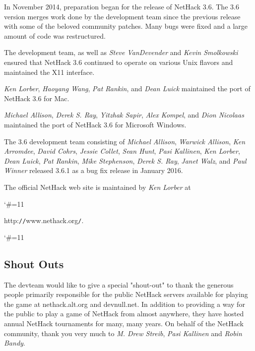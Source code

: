 \medskip
In November 2014, preparation began for the release of NetHack 3.6. The 3.6
version merges work done by the development team since the previous release 
with some of the beloved community patches. Many bugs were fixed and a 
large amount of code was restructured.

\medskip
The development team, as well as {\it Steve VanDevender} and 
{\it Kevin Smolkowski} ensured that NetHack 3.6 continued to operate on 
various Unix flavors and maintained the X11 interface. 

{\it Ken Lorber}, {\it Haoyang Wang}, {\it Pat Rankin}, and {\it Dean Luick} 
maintained the port of NetHack 3.6 for Mac.

\medskip
{\it Michael Allison}, {\it Derek S. Ray}, {\it Yitzhak Sapir}, 
{\it Alex Kompel}, and {\it Dion Nicolaas} maintained the port of 
NetHack 3.6 for Microsoft Windows.

\medskip
The 3.6 development team consisting of
{\it Michael Allison}, {\it Warwick Allison}, {\it Ken Arromdee},
{\it David Cohrs}, {\it Jessie Collet}, {\it Sean Hunt}, 
{\it Pasi Kallinen}, {\it Ken Lorber}, {\it Dean Luick}, {\it Pat Rankin}, 
{\it Mike Stephenson}, {\it Derek S. Ray}, {\it Janet Walz}, and {\it Paul Winner}
released 3.6.1 as a bug fix release in January 2016.

\medskip
\nd The official NetHack web site is maintained by {\it Ken Lorber} at 
{\catcode`\#=11
}
http:{\tt /}{\tt /}www.nethack.org{\tt /}.
{\catcode`\#=11
}


\subsection*{Shout Outs}
\nd The devteam would like to give a special "shout-out" to thank the generous 
people primarily responsible for the public NetHack servers available for 
playing the game at nethack.alt.org and devnull.net. In addition to providing 
a way for the public to play a game of NetHack from almost anywhere, they 
have hosted annual NetHack tournaments for many, many years. 
\nd On behalf of the NetHack community, thank you very much to 
{\it M. Drew Streib}, {\it Pasi Kallinen} and {\it Robin Bandy}.
\clearpage

